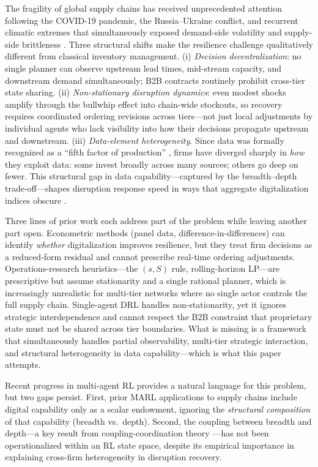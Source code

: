 \documentclass[11pt,a4paper]{article}
\theoremstyle{plain}
\theoremstyle{definition}
\begin{document}
The fragility of global supply chains has received unprecedented attention following the
COVID-19 pandemic, the Russia--Ukraine conflict, and recurrent climatic extremes that
simultaneously exposed demand-side volatility and supply-side brittleness
\citep{ivanov2020viable,hosseini2019review}.  Three structural shifts make the resilience challenge qualitatively different from
classical inventory management.
(i) \emph{Decision decentralization}: no single planner can observe upstream lead times,
mid-stream capacity, and downstream demand simultaneously; B2B contracts routinely
prohibit cross-tier state sharing.
(ii) \emph{Non-stationary disruption dynamics}: even modest shocks amplify through the
bullwhip effect into chain-wide stockouts, so recovery requires coordinated ordering
revisions across tiers---not just local adjustments by individual agents who lack
visibility into how their decisions propagate upstream and downstream.
(iii) \emph{Data-element heterogeneity}. Since data was formally recognized as a
``fifth factor of production'' \citep{liao1999quantitative}, firms have diverged sharply
in \emph{how} they exploit data: some invest broadly across many sources; others go deep
on fewer.  This structural gap in data capability---captured by the breadth--depth
trade-off---shapes disruption response speed in ways that aggregate digitalization
indices obscure \citep{sheffi2005resilient,hendricks2005empirical}.

Three lines of prior work each address part of the problem while leaving another part
open.  Econometric methods (panel data, difference-in-differences) can identify
\emph{whether} digitalization improves resilience, but they treat firm decisions as a
reduced-form residual and cannot prescribe real-time ordering adjustments.
Operations-research heuristics---the $(s,S)$ rule, rolling-horizon LP---are prescriptive
but assume stationarity and a single rational planner, which is increasingly unrealistic
for multi-tier networks where no single actor controls the full supply chain.  Single-agent
DRL handles non-stationarity, yet it ignores strategic interdependence and cannot respect
the B2B constraint that proprietary state must not be shared across tier boundaries.
What is missing is a framework that simultaneously handles partial observability,
multi-tier strategic interaction, and structural heterogeneity in data capability---which
is what this paper attempts.

Recent progress in multi-agent RL \citep{lowe2017multi,yu2022surprising,rashid2018qmix}
provides a natural language for this problem, but two gaps persist.  First, prior MARL
applications to supply chains \citep{oroojlooyjadid2022deep,zhang2020multi} include
digital capability only as a scalar endowment, ignoring the \emph{structural
composition} of that capability (breadth vs.\ depth).  Second, the coupling between
breadth and depth---a key result from coupling-coordination theory
\citep{liao1999quantitative}---has not been operationalized within an RL state space,
despite its empirical importance in explaining cross-firm heterogeneity in disruption
recovery.
\end{document}
